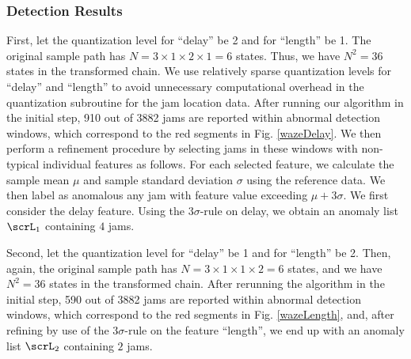 \documentclass[10pt, twocolumn]{IEEEtran}
\begin{document}
\subsubsection{Detection Results}
First, let the quantization level for ``delay'' be 2 and for ``length''
be 1. The original sample path has $N = 3 \times 1 \times 2 \times 1 =
6$ states. Thus, we have $N^2 = 36$ states in the transformed
chain. {We use relatively sparse quantization levels for ``delay''
  and ``length'' to avoid unnecessary computational overhead in the
  quantization subroutine for the jam location data.} After running our
algorithm in the initial step, 910 out of 3882 jams are reported within
abnormal detection windows, which correspond to the red segments in
Fig. \ref{wazeDelay}. We then perform a refinement procedure by
selecting jams in these windows with non-typical individual features as
follows. For each selected feature, we calculate the sample mean $\mu$
and sample standard deviation $\sigma$ using the reference data. We then
label as anomalous any jam with feature value exceeding $\mu + 3
\sigma$. We first consider the delay feature. Using the $3\sigma$-rule
on delay, we obtain an anomaly list $\scrL_1$ containing $4$ jams.

Second, let the quantization level for ``delay'' be 1 and for ``length''
be 2. Then, again, the original sample path has $N = 3 \times 1 \times 1
\times 2 = 6$ states, and we have $N^2 = 36$ states in the transformed
chain. After rerunning the algorithm in the initial step, 590 out of
3882 jams are reported within abnormal detection windows, which
correspond to the red segments in Fig. \ref{wazeLength}, and, after
refining by use of the $3\sigma$-rule on the feature ``length'', we end
up with an anomaly list $\scrL_2$ containing $2$ jams.
\end{document}
